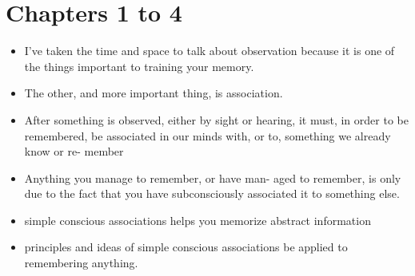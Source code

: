 
\chapter*{Chapters 1 to 4}


    \begin{itemize}
        \item I've taken the time and space to talk about observation
        because it is one of the things important to training your
        memory.
        \item The other, and more important thing, is association.
        \item After something is observed, either by sight or
        hearing, it must, in order to be remembered, be associated
        in our minds with, or to, something we already know or re-
        member
        \item Anything you manage to remember, or have man-
        aged to remember, is only due to the fact that you have
        subconsciously associated it to something else.
        \item simple conscious associations helps
        you memorize abstract information
        \item principles and ideas of simple conscious associations be applied to remembering anything.
    \end{itemize}


